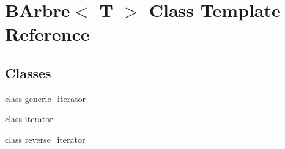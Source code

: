 \hypertarget{classBArbre}{
\section{BArbre$<$ T $>$ Class Template Reference}
\label{classBArbre}
}
\subsection*{Classes}
\begin{DoxyCompactItemize}
\item 
class \hyperlink{classBArbre_1_1generic__iterator}{generic\_\-iterator}
\item 
class \hyperlink{classBArbre_1_1iterator}{iterator}
\item 
class \hyperlink{classBArbre_1_1reverse__iterator}{reverse\_\-iterator}
\end{DoxyCompactItemize}
